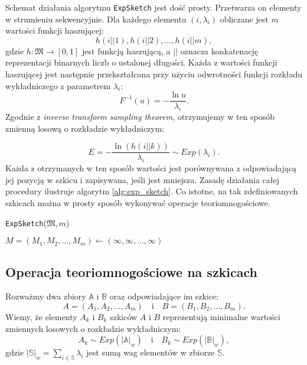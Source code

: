     Schemat działania algorytmu \texttt{ExpSketch} jest dość prosty. Przetwarza on elementy w strumieniu sekwencyjnie. Dla każdego elementu $(i, \lambda_{i})$ obliczane jest $m$ wartości funkcji haszującej:
    \[
        h(i || 1), h(i || 2), \dots, h(i || m),
    \]
    gdzie $h: \mathfrak{M} \rightarrow [0,1]$ jest funkcją haszującą, a $||$ oznacza konkatenację reprezentacji binarnych liczb o ustalonej długości. Każda z wartości funkcji haszującej jest następnie przekształcana przy użyciu odwrotności funkcji rozkładu wykładniczego z parametrem $\lambda_i$:
    \[
        F^{-1}(u) = - \frac{\ln u}{\lambda_i}.
    \]
    Zgodnie z \textit{inverse transform sampling theorem}\cite{Devroye_1986a}, otrzymujemy w ten sposób zmienną losową o rozkładzie wykładniczym:

    \[
        E = - \frac{\ln(h(i || k))}{\lambda_i} \sim Exp(\lambda_i).
    \]
    Każda z otrzymanych w ten sposób wartości jest porównywana z odpowiadającą jej pozycją w szkicu i zapisywana, jeśli jest mniejsza. Zasadę działania całej procedury ilustruje algorytm \ref{alg:exp_sketch}. Co istotne, na tak zdefiniowanych szkicach można w prosty sposób wykonywać operacje teoriomnogościowe. 

        \begin{algorithm}
        \caption{\texttt{ExpSketch}($\mathfrak{M}, m$)}\label{alg:exp_sketch}
        $M = (M_1, M_2, \dots, M_m) \gets (\infty, \infty, \dots, \infty)$\;
    \end{algorithm}

\subsection{Operacja teoriomnogościowe na szkicach}
    Rozważmy dwa zbiory $\mathbb{A}$ i $\mathbb{B}$ oraz odpowiadające im szkice: 
    \[
        A = (A_1, A_2, \dots, A_m) \quad \text{i} \quad B = (B_1, B_2, \dots, B_m).  
    \]
    Wiemy, że elementy $A_k$ i $B_k$ szkiców $A$ i $B$ reprezentują minimalne wartości zmiennych losowych o rozkładzie wykładniczym:
    \[
        A_k \sim Exp(|\mathbb{A}|_{w}) \quad \text{i} \quad B_k \sim Exp(|\mathbb{B}|_{w}), 
    \]
    gdzie $|\mathbb{S}|_{w} = \sum\limits_{i \in \mathbb{S}}\lambda_i$ jest sumą wag elementów w zbiorze $\mathbb{S}$. 
